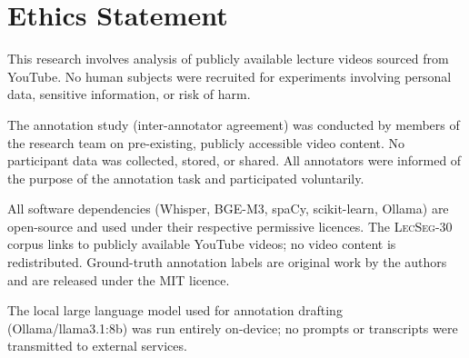 \section*{Ethics Statement}

This research involves analysis of publicly available lecture videos sourced from
YouTube. No human subjects were recruited for experiments involving personal data,
sensitive information, or risk of harm.

The annotation study (inter-annotator agreement) was conducted by members of the
research team on pre-existing, publicly accessible video content. No participant
data was collected, stored, or shared. All annotators were informed of the purpose
of the annotation task and participated voluntarily.

All software dependencies (Whisper, BGE-M3, spaCy, scikit-learn, Ollama) are
open-source and used under their respective permissive licences. The
\textsc{LecSeg-30} corpus links to publicly available YouTube videos; no video
content is redistributed. Ground-truth annotation labels are original work by the
authors and are released under the MIT licence.

The local large language model used for annotation drafting (Ollama/llama3.1:8b)
was run entirely on-device; no prompts or transcripts were transmitted to external
services.

\pagebreak
